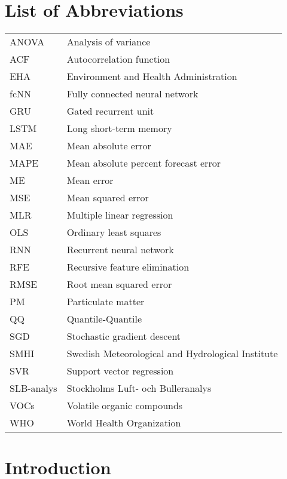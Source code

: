 \documentclass[12pt]{report}
\numberwithin{equation}{section}
\begin{document}
\chapter*{List of Abbreviations}
\begin{tabular}{l@{$\dots\dots$}p{12cm}}
ANOVA \dotfill &  Analysis of variance  \\
ACF \dotfill & Autocorrelation function \\
EHA \dotfill & Environment and Health Administration \\
fcNN \dotfill & Fully connected neural network   \\
GRU \dotfill & Gated recurrent unit \\
LSTM \dotfill &  Long short-term memory\\
MAE\dotfill & Mean absolute error \\
MAPE \dotfill & Mean absolute percent forecast error \\
ME \dotfill & Mean error \\
MSE\dotfill & Mean squared error \\
MLR \dotfill & Multiple linear regression \\
OLS \dotfill & Ordinary least squares \\
RNN\dotfill & Recurrent neural network \\
RFE \dotfill & Recursive feature elimination \\
RMSE\dotfill & Root mean squared error\\
PM \dotfill & Particulate matter \\
QQ  \dotfill & Quantile-Quantile \\
SGD \dotfill & Stochastic gradient descent \\
SMHI\dotfill & Swedish Meteorological and Hydrological Institute \\
SVR \dotfill & Support vector regression \\
SLB-analys \dotfill & Stockholms Luft- och Bulleranalys \\
VOCs \dotfill & Volatile organic compounds \\
WHO \dotfill & World Health Organization \\
\end{tabular}




\chapter{Introduction}
\setcounter{page}{1}

\end{document}
